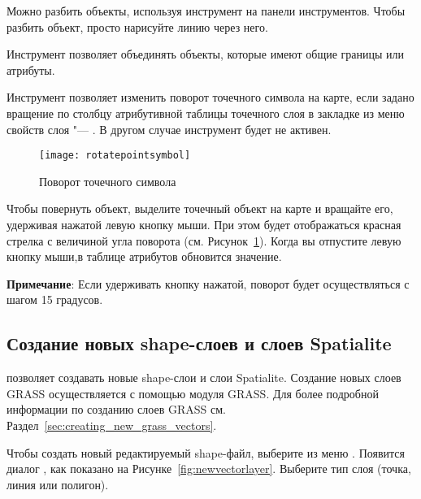Можно разбить объекты, используя инструмент
 на панели
инструментов. Чтобы разбить объект, просто нарисуйте линию через него.


Инструмент 
позволяет объединять объекты, которые имеют общие границы или атрибуты.


Инструмент  позволяет
изменить поворот точечного символа на карте, если задано вращение по столбцу
атрибутивной таблицы точечного слоя в закладке  из меню
свойств слоя "--- . В другом случае инструмент будет не
активен.

\begin{figure}[ht]
   \centering
   \texttt{[image: rotatepointsymbol]}
   \caption{Поворот точечного символа \nixcaption}\label{fig:rotatepoint}
\end{figure}

Чтобы повернуть объект, выделите точечный объект на карте и вращайте его,
удерживая нажатой левую кнопку мыши. При этом будет отображаться красная
стрелка с величиной угла поворота (см. Рисунок~\ref{fig:rotatepoint}).
Когда вы отпустите левую кнопку мыши,в таблице атрибутов обновится значение.

\textbf{Примечание}: Если удерживать кнопку  нажатой, поворот
будет осуществляться с шагом 15 градусов.

\subsection{Создание новых shape-слоев и слоев Spatialite}\label{sec:create shape}

\qg позволяет создавать новые shape-слои и слои Spatialite. Создание новых
слоев GRASS осуществляется с помощью модуля GRASS. Для более подробной
информации по созданию слоев GRASS см. Раздел~\ref{sec:creating_new_grass_vectors}.

\label{sec:create shape}

Чтобы создать новый редактируемый shape-файл, выберите  \arrow
{} из меню
. Появится диалог , как показано
на Рисунке~\ref{fig:newvectorlayer}. Выберите тип слоя (точка, линия или полигон).

